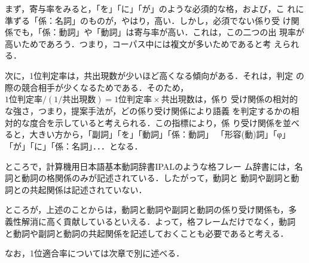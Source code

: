 まず，寄与率をみると，「を」「に」「が」のような必須的な格，および，こ
れに準ずる「係：名詞」のものが，やはり，高い．しかし，必須でない係り受
け関係でも，「係：動詞」や「動詞」は寄与率が高い．これは，この二つの出
現率が高いためであろう．つまり，コーパス中には複文が多いためであると考
えられる．

次に，1位判定率は，共出現数が少いほど高くなる傾向がある．それは，判定
の際の競合相手が少くなるためである．そのため，$\mbox{1位判定率}
/(1/\mbox{共出現数}) = \mbox{1位判定率}\times\mbox{共出現数}$は，係り
受け関係の相対的な強さ，つまり，提案手法が，どの係り受け関係により語義
を判定するかの相対的な度合を示していると考えられる．この指標により，係
り受け関係を並べると，大きい方から，「副詞」「を」「動詞」「係：動詞」
「形容(動)詞」「φ」「が」「に」「係：名詞」．．．となる．

ところで，計算機用日本語基本動詞辞書IPAL\cite{IPAL87}のような格フレー
ム辞書には，名詞と動詞の格関係のみが記述されている．したがって，動詞と
動詞や副詞と動詞との共起関係は記述されていない．

ところが，上述のことからは，動詞と動詞や副詞と動詞の係り受け関係も，多
義性解消に高く貢献しているといえる．よって，格フレームだけでなく，動詞
と動詞や副詞と動詞の共起関係を記述しておくことも必要であると考える．

なお，1位適合率については次章で別に述べる．

